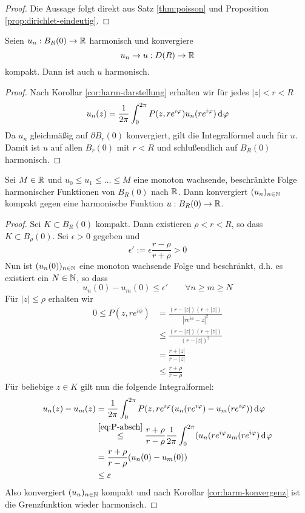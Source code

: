 \begin{proof}
  Die Aussage folgt direkt aus Satz \ref{thm:poisson} und Proposition \ref{prop:dirichlet-eindeutig}.
\end{proof}

\begin{cor}
  \label{cor:harm-konvergenz}
  Seien $u_n : B_R(0) \rightarrow \mathbb{R}$ harmonisch und konvergiere
  \[
  u_n \rightarrow u: D(R) \rightarrow \mathbb{R}
  \]
  kompakt. Dann ist auch $u$ harmonisch.
\end{cor}

\begin{proof}
  Nach Korollar \ref{cor:harm-darstellung} erhalten wir für jedes $|z|
  < r <R$
  \[
  u_n(z) = \frac{1}{2\pi} \int_0^{2\pi} P(z, re^{i\phi})
  u_n(re^{i\phi}) \d[\phi]
  \]
  Da $u_n$ gleichmäßig auf $\partial B_r(0)$ konvergiert, gilt die
  Integralformel auch für $u$. Damit ist $u$ auf allen $B_r(0)$ mit $r <
  R$ und schlußendlich auf $B_R(0)$ harmonisch.
\end{proof}

\begin{thm}
  \label{thm:harnack}
  Sei $M \in \mathbb{R}$ und $u_0 \leq u_1 \leq \dots \leq M$ eine monoton
  wachsende, beschränkte Folge harmonischer Funktionen von $B_R(0)$ nach
  $\mathbb{R}$. Dann konvergiert $(u_n)_{n\in \mathbb{N}}$ kompakt gegen eine harmonische
  Funktion $u: B_R(0) \rightarrow \mathbb{R}$.
\end{thm}

\begin{proof}
  Sei $K \subset B_R(0)$ kompakt. Dann existieren $\rho < r < R$, so
  dass $K \subset \overline{B_\rho(0)}$. Sei $\epsilon > 0$ gegeben und
  \[
  \epsilon' := \epsilon \frac{r - \rho}{ r+ \rho} > 0
  \]
  Nun ist $(u_n(0))_{n \in \mathbb{N}}$ eine monoton wachsende Folge und
  beschränkt, d.h. es existiert ein $N \in \mathbb{N}$, so dass
  \[
  u_n(0) - u_m(0) \leq \epsilon' \qquad \forall n \geq m \geq N
  \]
  Für $|z| \leq \rho$ erhalten wir
  \begin{align}
    0 \leq P(z, re^{i\phi}) & = \frac{(r - |z|)(r+|z|)}{|re^{i\phi} -
      z|^2} \nonumber\\
    & \leq \frac{(r- |z|)(r + |z|)}{(r - |z|)^2} \nonumber\\
    & = \frac{r + |z|}{r - |z|} \nonumber\\
    & \leq \frac{ r + \rho}{ r - \rho} \label{eq:P-absch} 
  \end{align}
  Für beliebige $z \in K$ gilt nun die folgende Integralformel:
  \begin{align*}
    u_n(z) - u_m(z) & = \frac{1}{2\pi} \int_0^{2\pi} P(z, re^{i\phi}
    (u_n(re^{i\phi}) - u_m(re^{i\phi})) \d[\phi] \\
    & \stackrel{\eqref{eq:P-absch}}{\leq} \frac{r + \rho}{r - \rho}
    \frac{1}{2\pi} \int_0^{2\pi} (u_n(r e^{i\phi} u_m(re^{i\phi})
    \d[\phi] \\
    & = \frac{r+\rho}{r - \rho} (u_n(0) - u_m(0)) \\
    & \leq \epsilon 
  \end{align*}
  Also konvergiert $(u_n)_{n \in \mathbb{N}}$ kompakt und nach Korollar
  \ref{cor:harm-konvergenz} ist die Grenzfunktion wieder harmonisch.
\end{proof}

